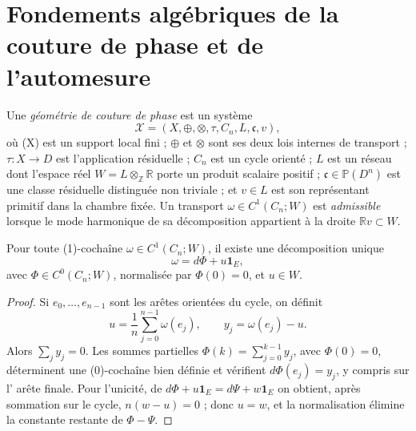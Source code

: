\providecommand{\X}{\mathcal X}
\providecommand{\Acal}{\mathfrak a}
\providecommand{\bd}{\partial}
\providecommand{\oneE}{\mathbf 1_E}

\section{Fondements algébriques de la couture de phase et de l'automesure}

\begin{definition}
Une \emph{géométrie de couture de phase} est un système
\[
\X=(X,\oplus,\otimes,\tau,C_n,L,\mathfrak c,v),
\]
où (X) est un support local fini ; \(\oplus\) et \(\otimes\) sont ses
deux lois internes de transport ; \(\tau:X\to D\) est l'application résiduelle ;
\(C_n\) est un cycle orienté ; \(L\) est un réseau dont l'espace réel
\(W=L\otimes_{\mathbb Z}\mathbb R\) porte un produit scalaire positif ;
\(\mathfrak c\in\mathbb P(D^n)\) est une classe résiduelle distinguée non
triviale ; et \(v\in L\) est son représentant primitif dans la chambre fixée.
Un transport \(\omega\in C^1(C_n;W)\) est \emph{admissible} lorsque le mode
harmonique de sa décomposition appartient à la droite
\(\mathbb Rv\subset W\).
\end{definition}

\begin{theorem}
\label{thm:hodge-cycle}
Pour toute (1)-cochaîne \(\omega\in C^1(C_n;W)\), il existe une décomposition
unique
\[
  \omega=d\Phi+u\oneE,
\]
avec \(\Phi\in C^0(C_n;W)\), normalisée par \(\Phi(0)=0\), et \(u\in W\).
\end{theorem}

\begin{proof}
Si \(e_0,\ldots,e_{n-1}\) sont les arêtes orientées du cycle, on définit
\[
 u=\frac1n\sum_{j=0}^{n-1}\omega(e_j),
 \qquad y_j=\omega(e_j)-u.
\]
Alors \(\sum_jy_j=0\). Les sommes partielles
\(\Phi(k)=\sum_{j=0}^{k-1}y_j\), avec \(\Phi(0)=0\), déterminent une
(0)-cochaîne bien définie et vérifient \(d\Phi(e_j)=y_j\), y compris sur l'
arête finale. Pour l'unicité, de
\(d\Phi+u\oneE=d\Psi+w\oneE\) on obtient, après sommation sur le cycle,
\(n(w-u)=0\) ; donc \(u=w\), et la normalisation élimine la constante
restante de \(\Phi-\Psi\).
\end{proof}

